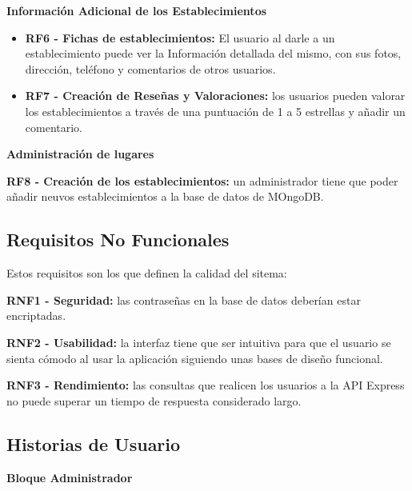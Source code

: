 \documentclass[a4paper,11pt]{article}
\begin{document}
\textbf{Información Adicional de los Establecimientos}
\begin{itemize}
    \item \textbf{RF6 - Fichas de establecimientos:} El usuario al darle a un establecimiento puede ver la Información detallada del mismo, con sus fotos, dirección, teléfono y comentarios de otros usuarios.
    \item \textbf{RF7 - Creación de Reseñas y Valoraciones:} los usuarios pueden valorar los establecimientos a través de una puntuación de 1 a 5 estrellas y añadir un comentario.
\end{itemize}

\textbf{Administración de lugares}

\textbf{RF8 - Creación de los establecimientos:} un administrador tiene que poder añadir neuvos establecimientos a la base de datos de MOngoDB.

\vspace{0.5cm}
\subsection{Requisitos No Funcionales}
Estos requisitos son los que definen la calidad del sitema:

\textbf{RNF1 - Seguridad:} las contraseñas en la base de datos deberían estar encriptadas.

\textbf{RNF2 - Usabilidad:} la interfaz tiene que ser intuitiva para que el usuario se sienta cómodo al usar la aplicación siguiendo unas bases de diseño funcional.

\textbf{RNF3 - Rendimiento:} las consultas que realicen los usuarios a la API Express no puede superar un tiempo de respuesta considerado largo.

\vspace{0.5cm}
\subsection{Historias de Usuario}

\textbf{Bloque Administrador}
\end{document}
